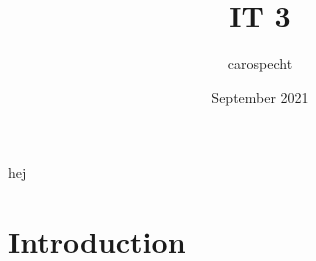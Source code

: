 \documentclass{article}
\title{IT 3}
\author{carospecht }
\date{September 2021}
\begin{document}
hej

\maketitle

\section{Introduction}
\end{document}
